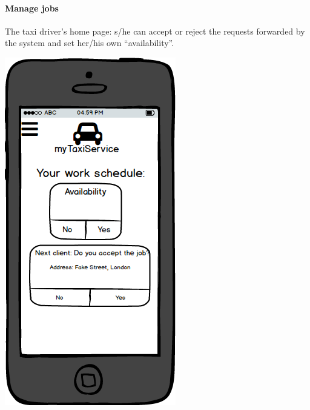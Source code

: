\documentclass[a4paper,11pt]{report} %
\begin{document}
	\paragraph{Manage jobs} The taxi driver's home page: s/he can accept or reject the requests forwarded by the system and set her/his own ``availability''.
	\begin{center}
		\includegraphics[width=0.4\linewidth]{Pictures/DriverPage}
	\end{center}
	\pagebreak
	
\end{document}

